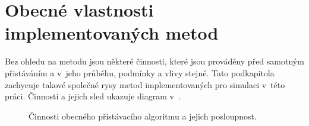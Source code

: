     \section{Obecné vlastnosti implementovaných metod} \label{sec:generalalg}
    Bez ohledu na metodu jsou některé činnosti, které jsou prováděny před samotným přistáváním a v~jeho průběhu, podmínky a vlivy stejné. Tato podkapitola zachycuje takové společné rysy metod implementovaných pro simulaci v~této práci. Činnosti a jejich sled ukazuje diagram v~.
    \begin{figure}
        \centering
        \caption[Činnosti obecného přistávacího algoritmu]{Činnosti obecného přistávacího algoritmu a jejich posloupnost.}
        \label{fig:algObecny}
    \end{figure}
    
